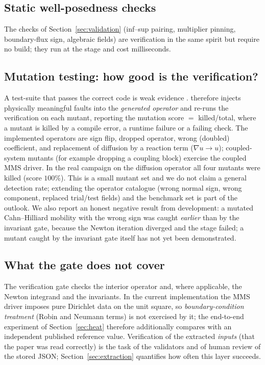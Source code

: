 \subsection{Static well-posedness checks}
The checks of Section~\ref{sec:validation} (inf--sup pairing, multiplier pinning, boundary-flux sign, algebraic fields) are verification in the same spirit but require no build; they run at the  stage and cost milliseconds.

\subsection{Mutation testing: how good is the verification?}
A test-suite that passes the correct code is weak evidence \citep{demillo1978,jia2011}. \femagent{} therefore injects physically meaningful faults into the \emph{generated operator} and re-runs the verification on each mutant, reporting the mutation score $=$ killed/total, where a mutant is killed by a compile error, a runtime failure or a failing check. The implemented operators are sign flip, dropped operator, wrong (doubled) coefficient, and replacement of diffusion by a reaction term ($\nabla u\to u$); coupled-system mutants (for example dropping a coupling block) exercise the coupled MMS driver. In the real campaign on the diffusion operator all four mutants were killed (score $100\%$). This is a small mutant set and we do not claim a general detection rate; extending the operator catalogue (wrong normal sign, wrong component, replaced trial/test fields) and the benchmark set is part of the outlook. We also report an honest negative result from development: a mutated Cahn--Hilliard mobility with the wrong sign was caught \emph{earlier} than by the invariant gate, because the Newton iteration diverged and the  stage failed; a mutant caught by the invariant gate itself has not yet been demonstrated.

\subsection{What the gate does not cover}
The verification gate checks the interior operator and, where applicable, the Newton integrand and the invariants. In the current implementation the MMS driver imposes pure Dirichlet data on the unit square, so \emph{boundary-condition treatment} (Robin and Neumann terms) is not exercised by it; the end-to-end experiment of Section~\ref{sec:heat} therefore additionally compares with an independent published reference value. Verification of the extracted \emph{inputs} (that the paper was read correctly) is the task of the validators and of human review of the stored JSON; Section~\ref{sec:extraction} quantifies how often this layer succeeds.
